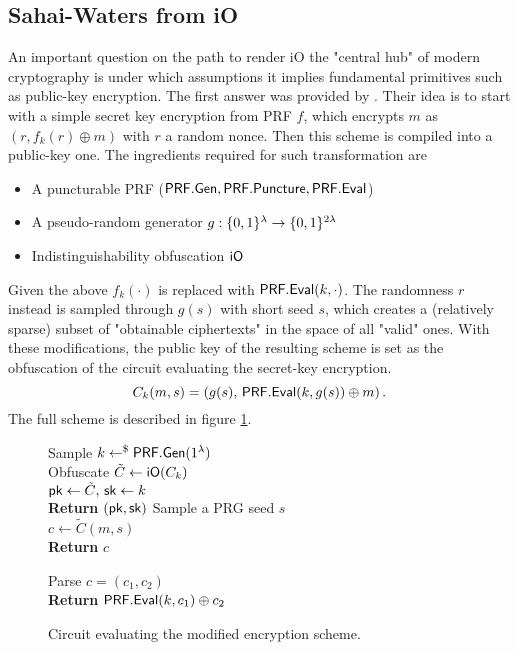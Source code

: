 \subsection{Sahai-Waters from iO}

An important question on the path to render iO the "central hub" of modern cryptography is under which assumptions it implies fundamental primitives such as public-key encryption.
The first answer was provided by \cite{STOC:SahWat14}.
Their idea is to start with a simple secret key encryption from PRF $f$, which encrypts $m$ as $(r, f_k(r) \oplus m)$ with $r$ a random nonce.
Then this scheme is compiled into a public-key one.
The ingredients required for such transformation are
\begin{itemize}
	\item A puncturable PRF ($\mathsf{PRF.Gen}, \mathsf{PRF.Puncture}, \mathsf{PRF.Eval}$) 
	\item A pseudo-random generator $g : \{0,1\}^\lambda \to \{0,1\}^{2\lambda}$
	\item Indistinguishability obfuscation $\mathsf{iO}$
\end{itemize}
Given the above $f_k(\cdot)$ is replaced with $\mathsf{PRF.Eval}(k, \cdot)$.
The randomness $r$ instead is sampled through $g(s)$ with short seed $s$, which creates a (relatively sparse) subset of "obtainable ciphertexts" in the space of all "valid" ones.
With these modifications, the public key of the resulting scheme is set as the obfuscation of the circuit evaluating the secret-key encryption.
\[
	C_k(m, s) = \left(
		g(s),
			\,
		\mathsf{PRF.Eval}(k, g(s)) \oplus m
	\right).
\]
The full scheme is described in figure \ref{prot:SahWat14:pke_from_io}.

\begin{figure}[htb]
	\centering
	\begin{pchstack}[center, space=12pt]
		{
			Sample $k \gets^{\$} \mathsf{PRF.Gen}(1^\lambda)$
				\\
			Obfuscate $\tilde{C} \gets \mathsf{iO}(C_k)$
				\\
			$\mathsf{pk} \gets \tilde{C}, \, \mathsf{sk} \gets k$
				\\
			\textbf{Return} $(\mathsf{pk}, \mathsf{sk})$
		}
		{
			Sample a PRG seed $s$
				\\
			$c \gets \tilde{C}(m, s)$
				\\
			\textbf{Return} $c$
		}
	\end{pchstack}
	\begin{pchstack}[center, space=12pt]
		{
			Parse $c = (c_1, c_2)$
				\\
			\textbf{Return} $\mathsf{PRF.Eval}(k, c_1) \oplus c_2$
		}
	\end{pchstack}
	\label{prot:SahWat14:pke_from_io}
	\caption{Circuit evaluating the modified encryption scheme.}
\end{figure}

